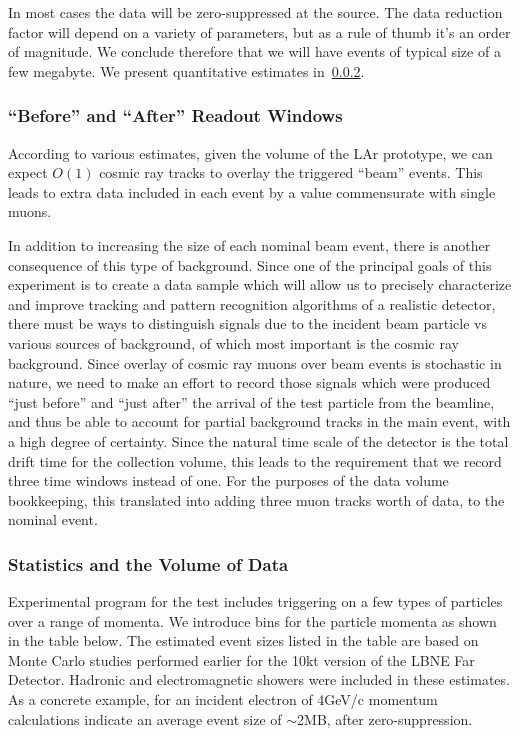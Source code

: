 In most cases the data will be zero-suppressed at the source. The data reduction factor will depend on a variety of parameters, but as a rule of thumb
it's an order of magnitude. We conclude therefore that we will have events of typical size of a few megabyte. We present quantitative estimates in~\ref{bin_table}.

\subsubsection{``Before'' and ``After'' Readout Windows}
\label{readout_windows}

According to various estimates, given the volume of the LAr prototype, we can expect $O(1)$ cosmic ray tracks to overlay
the triggered ``beam'' events. This leads to extra data included in each event by a value commensurate with single muons.

In addition to increasing the size of each nominal beam event, there is another consequence of this type of background.
Since one of the principal goals of this experiment is to create a data sample which will allow us to precisely characterize
and improve tracking and pattern recognition algorithms of a realistic detector, there must be ways to distinguish signals
due to the incident beam particle vs various sources of background, of which most important is the cosmic ray background.
Since overlay of cosmic ray muons over beam events is stochastic in nature, we need to make an effort to record those
signals which were produced ``just before'' and ``just after'' the arrival of the test particle from the beamline, and thus
be able to account for partial background tracks in the main event, with a high degree of certainty. Since the natural time
scale of the detector is the total drift time for the collection volume, this leads to the requirement that we record three time windows
instead of one. For the purposes of the data volume bookkeeping, this translated into adding three muon tracks worth of data,
to the nominal event.


\subsubsection{Statistics and the Volume of Data}
\label{bin_table}
Experimental program for the test includes triggering on a few types of particles over a range of momenta. We introduce
bins for the particle momenta as shown in the table below. The estimated event sizes listed in the table are based on
Monte Carlo studies performed earlier for the 10kt version of the LBNE Far Detector. Hadronic and electromagnetic
showers were included in these estimates. As a concrete example, for an incident electron of 4GeV/c momentum
calculations indicate an average event size of $\sim$2MB, after zero-suppression.


